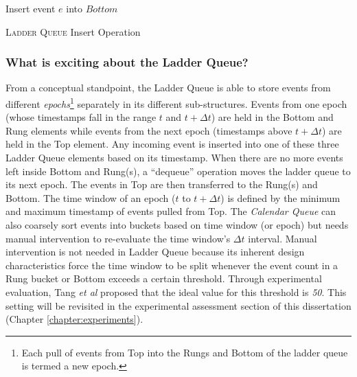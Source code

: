 \documentclass[11pt]{book}
\begin{document}
\begin{algorithm}
\DontPrintSemicolon
{}

    \;
    \;
    \;
    \;
    Insert event $e$ into $Bottom$\;
    \Return\;
    \;
\caption{\textsc{Ladder Queue} Insert Operation}\label{algo:ladderq_insert}
\end{algorithm}

\subsubsection{What is exciting about the Ladder Queue?}\label{subsubsec:why_ladder}

From a conceptual standpoint, the Ladder Queue is able to store events from different
\emph{epochs}\footnote{Each pull of events from Top into the Rungs and Bottom of the ladder queue is termed a
  new epoch.} separately in its different sub-structures.  Events from one epoch (whose timestamps fall in the
range $t$ and $t+\Delta t$) are held in the Bottom and Rung elements while events from the next epoch
(timestamps above $t+\Delta t$) are held in the Top element.  Any incoming event is inserted into one of these
three Ladder Queue elements based on its timestamp.  When there are no more events left inside Bottom and
Rung(s), a ``dequeue'' operation moves the ladder queue to its next epoch.  The events in Top are then
transferred to the Rung(s) and Bottom.  The time window of an epoch ($t$ to $t+\Delta t$) is defined by the
minimum and maximum timestamp of events pulled from Top.  The \emph{Calendar Queue} \cite{brown-88} can also
coarsely sort events into buckets based on time window (or epoch) but needs manual intervention to re-evaluate
the time window's $\Delta t$ interval.  Manual intervention is not needed in Ladder Queue because its inherent
design characteristics force the time window to be split whenever the event count in a Rung bucket or Bottom
exceeds a certain threshold.  Through experimental evaluation, Tang \emph{et al} \cite{tang-05} proposed that
the ideal value for this threshold is \emph{50}.  This setting will be revisited in the experimental
assessment section of this dissertation (Chapter \ref{chapter:experiments}).
\end{document}
